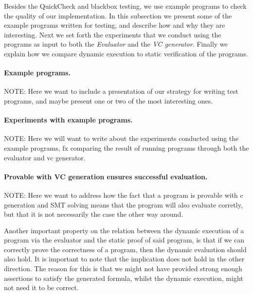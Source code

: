 Besides the QuickCheck and blackbox testing, we use example programs to check the quality of our implementation.
In this subsection we present some of the example programs written for testing, and describe how and why they are interesting.
Next we set forth the experiments that we conduct using the programs as input to both the \textit{Evaluator} and the \textit{VC generator}.
Finally we explain how we compare dynamic execution to static verification of the programs.

\paragraph{Example programs.}
NOTE: Here we want to include a presentation of our strategy for writing test programs, and maybe present one or two of the most interesting ones.


\paragraph{Experiments with example programs.}
NOTE: Here we will want to write about the experiments conducted using the example programs, fx comparing the result of running programs through both the evaluator and vc generator.


\paragraph{Provable with VC generation ensures successful evaluation.}
NOTE: Here we want to address how the fact that a program is provable with c generation and SMT solving means that the program will also evaluate corretly, but that it is not necessarily the case the other way around.

Another important property on the relation between the dynamic execution of a program via the evaluator and the static proof of said program, is that if we can correctly prove the correctness of a program, then the dynamic evaluation should also hold. It is important to note that the implication does not hold in the other direction. The reason for this is that we might not have provided strong enough assertions to satisfy the generated formula, whilst the dynamic execution, might not need it to be correct.

